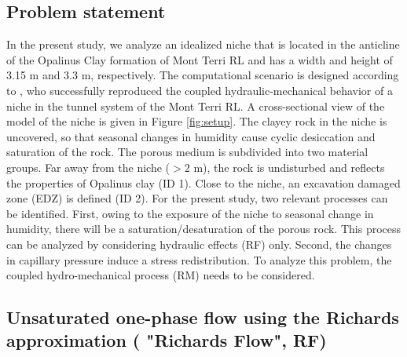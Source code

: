 \subsection{Problem statement}
In the present study, we analyze an idealized niche that is located in the anticline of the Opalinus Clay formation of Mont Terri RL and has a width and height of 3.15 m and 3.3 m, respectively. The computational scenario is designed according to \cite{ziefle2018}, who successfully reproduced the coupled hydraulic-mechanical behavior of a niche in the tunnel system of the Mont Terri RL.   A cross-sectional view of the model of the niche is given in Figure \ref{fig:setup}. The clayey rock in the niche is uncovered, so that seasonal changes in humidity cause cyclic desiccation and saturation of the rock. The porous medium is subdivided into two material groups. Far away from the niche ($> 2$ m), the rock is undisturbed and reflects the properties of Opalinus clay (ID 1). Close to the niche, an excavation damaged zone (EDZ) is defined (ID 2). For the present study, two relevant processes can be identified. First, owing to the exposure of the niche to seasonal change in humidity, there will be a saturation/desaturation of the porous rock. This process can be analyzed by considering hydraulic effects (RF) only. Second, the changes in capillary pressure induce a stress redistribution. To analyze this problem, the coupled hydro-mechanical process (RM) needs to be considered.

\subsection{Unsaturated one-phase flow using the Richards approximation ( "Richards Flow", RF)}
\label{sec:RF}

